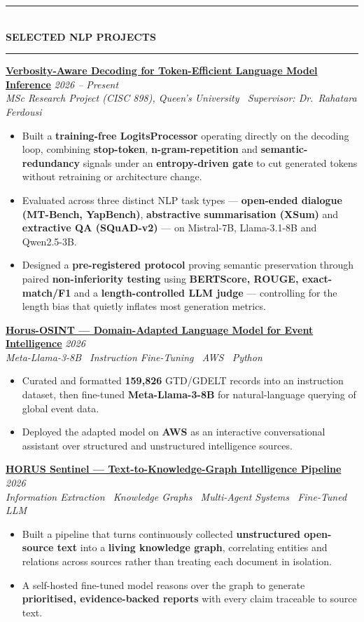 \documentclass[10pt, a4paper]{article}
\newcommand{\cvsection}[1]{%
  \vspace{3pt}%
  {\color{navy}\rule{\linewidth}{1.1pt}}\\[0.5pt]%
  {\color{navy}\bfseries\fontsize{9.5}{11}\selectfont\uppercase{#1}}\\[-4pt]%
  {\color{teal}\rule{\linewidth}{0.6pt}}%
  \vspace{2pt}%
}
\newcommand{\cvproject}[3]{%
  \vspace{2.5pt}%
  {\bfseries\color{navy}#1} \hfill {\color{midgray}\textit{#3}}\\[-1.5pt]%
  {\color{teal}\textit{#2}}%
}
\newenvironment{cvitems}{%
  \begin{itemize}[leftmargin=11pt, itemsep=0.5pt, parsep=0pt, topsep=1pt,
                  label={\textcolor{teal}{$\bullet$}}]
}{%
  \end{itemize}%
}
\begin{document}
\cvsection{Selected NLP Projects}

\cvproject{\href{https://github.com/MahmoudAlyosify/minimal-lm}{Verbosity-Aware Decoding for Token-Efficient Language Model Inference}}
          {MSc Research Project (CISC 898), Queen's University \textperiodcentered\ Supervisor: Dr.\ Rahatara Ferdousi}
          {2026 -- Present}
\begin{cvitems}
  \item Built a \textbf{training-free LogitsProcessor} operating directly on the decoding loop, combining \textbf{stop-token}, \textbf{n-gram-repetition} and \textbf{semantic-redundancy} signals under an \textbf{entropy-driven gate} to cut generated tokens without retraining or architecture change.
  \item Evaluated across three distinct NLP task types --- \textbf{open-ended dialogue (MT-Bench, YapBench)}, \textbf{abstractive summarisation (XSum)} and \textbf{extractive QA (SQuAD-v2)} --- on Mistral-7B, Llama-3.1-8B and Qwen2.5-3B.
  \item Designed a \textbf{pre-registered protocol} proving semantic preservation through paired \textbf{non-inferiority testing} using \textbf{BERTScore, ROUGE, exact-match/F1} and a \textbf{length-controlled LLM judge} --- controlling for the length bias that quietly inflates most generation metrics.
\end{cvitems}

\cvproject{\href{https://github.com/MahmoudAlyosify/Horus-OSINT}{Horus-OSINT --- Domain-Adapted Language Model for Event Intelligence}}
          {Meta-Llama-3-8B \textperiodcentered\ Instruction Fine-Tuning \textperiodcentered\ AWS \textperiodcentered\ Python}
          {2026}
\begin{cvitems}
  \item Curated and formatted \textbf{159,826} GTD/GDELT records into an instruction dataset, then fine-tuned \textbf{Meta-Llama-3-8B} for natural-language querying of global event data.
  \item Deployed the adapted model on \textbf{AWS} as an interactive conversational assistant over structured and unstructured intelligence sources.
\end{cvitems}

\cvproject{\href{https://github.com/MahmoudAlyosify/horus-sentinel}{HORUS Sentinel --- Text-to-Knowledge-Graph Intelligence Pipeline}}
          {Information Extraction \textperiodcentered\ Knowledge Graphs \textperiodcentered\ Multi-Agent Systems \textperiodcentered\ Fine-Tuned LLM}
          {2026}
\begin{cvitems}
  \item Built a pipeline that turns continuously collected \textbf{unstructured open-source text} into a \textbf{living knowledge graph}, correlating entities and relations across sources rather than treating each document in isolation.
  \item A self-hosted fine-tuned model reasons over the graph to generate \textbf{prioritised, evidence-backed reports} with every claim traceable to source text.
\end{cvitems}
\end{document}

